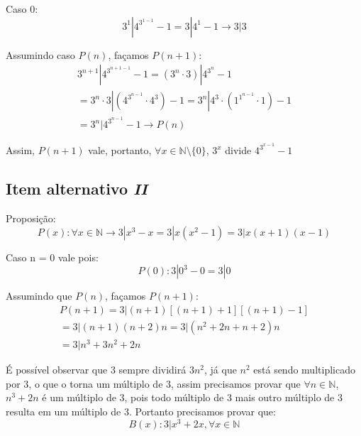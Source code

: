 \documentclass{article}
\begin{document}
    Caso 0:
    \begin{equation*}
        3^1|4^{3^{1-1}}-1 = 3|4^1 - 1\rightarrow 3|3
    \end{equation*}

    Assumindo caso $P(n)$, façamos $P(n+1)$:
    \begin{equation*}
        \begin{aligned}
            3^{n+1}|4^{3^{n+1-1}}-1 = (3^n\cdot 3)|4^{3^n}-1 \\
            = 3^n\cdot3|(4^{3^{n-1}}\cdot4^{3}) - 1 =
            3^n|4^3\cdot(1^{1^{n-1}}\cdot1) - 1 \\
            = 3^n|4^{3^{n-1}} - 1 \rightarrow P(n)
        \end{aligned}
    \end{equation*}

    Assim, $P(n+1)$ vale, portanto, $\forall x\in\mathbb{N}
    \setminus\{0\}$, $3^x$ divide $4^{3^{x-1}}-1$

    \subsection*{Item alternativo \emph{II}}
    Proposição:
    \begin{equation*}
        P(x): \forall x\in\mathbb{N} \rightarrow 3|x^3 - x =
        3|x(x^2 - 1) = 3|x(x + 1)(x - 1)
    \end{equation*}

    Caso n = 0 vale pois:
    \begin{equation*}
        P(0):  3 | 0^3 - 0 = 3|0
    \end{equation*}

    Assumindo que $P(n)$, façamos $P(n + 1)$:
    \begin{equation*}
        \begin{aligned}
            P(n+1) = 3|(n + 1)[(n + 1) + 1][(n + 1) - 1] \\
            = 3|(n+1)(n+2)n = 3|(n^2 + 2n + n + 2)n \\
            = 3|n^3 + 3n^2 + 2n
        \end{aligned}
    \end{equation*}

    É possível observar que $3$ sempre dividirá $3n^2$, já que
    $n^2$ está sendo multiplicado por $3$, o que o torna um
    múltiplo de $3$, assim precisamos provar que $\forall
    n\in\mathbb{N}$, $n^3 + 2n$ é um múltiplo de $3$, pois
    todo múltiplo de $3$ mais outro múltiplo de $3$ resulta
    em um múltiplo de 3. Portanto precisamos provar que:
    \begin{equation*}
        B(x): 3|x^3 + 2x, \forall x\in\mathbb{N}
    \end{equation*}
\end{document}
